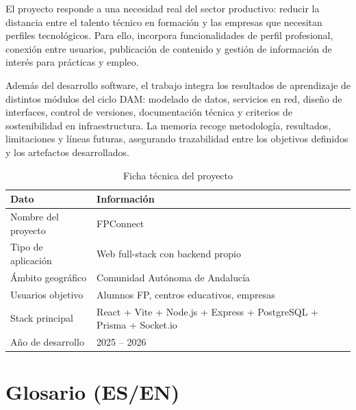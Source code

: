 \documentclass[12pt, a4paper]{report}
\begin{document}
El proyecto responde a una necesidad real del sector productivo: reducir la distancia entre el talento
técnico en formación y las empresas que necesitan perfiles tecnológicos. Para ello, incorpora
funcionalidades de perfil profesional, conexión entre usuarios, publicación de contenido y gestión de
información de interés para prácticas y empleo.

Además del desarrollo software, el trabajo integra los resultados de aprendizaje de distintos módulos
del ciclo DAM: modelado de datos, servicios en red, diseño de interfaces, control de versiones,
documentación técnica y criterios de sostenibilidad en infraestructura. La memoria recoge metodología,
resultados, limitaciones y líneas futuras, asegurando trazabilidad entre los objetivos definidos y los
artefactos desarrollados.

\vspace{1em}
\begin{table}[H]
  \centering
  \caption{Ficha técnica del proyecto}
  \begin{tabularx}{\textwidth}{lX}
    \toprule
    \textbf{Dato} & \textbf{Información} \\
    \midrule
    Nombre del proyecto   & FPConnect \\
    Tipo de aplicación    & Web full-stack con backend propio \\
    Ámbito geográfico     & Comunidad Autónoma de Andalucía \\
    Usuarios objetivo     & Alumnos FP, centros educativos, empresas \\
    Stack principal       & React + Vite + Node.js + Express + PostgreSQL + Prisma + Socket.io \\
    Año de desarrollo     & 2025 – 2026 \\
    \bottomrule
  \end{tabularx}
\end{table}

\chapter{Glosario (ES/EN)}
\end{document}
